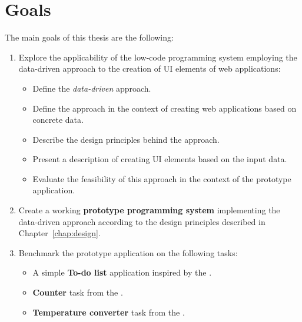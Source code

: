 \section*{Goals}
\nopagebreak[4]
The main goals of this thesis are the following:
\nopagebreak[4]
\begin{enumerate}
	\item Explore the applicability of the low-code programming system employing the data-driven approach to the creation of UI elements of web applications:
	      \begin{itemize}
		      \item Define the \emph{data-driven} approach.
		      \item Define the approach in the context of creating web applications based on concrete data.
		      \item Describe the design principles behind the approach.
		      \item Present a description of creating UI elements based on the input data.
		      \item Evaluate the feasibility of this approach in the context of the prototype application.
	      \end{itemize}
	\item Create a working \textbf{prototype programming system} implementing the data-driven approach according to the design principles described in Chapter~\ref{chap:design}.
	\item Benchmark the prototype application on the following tasks:
	      \begin{itemize}
		      \item A simple \textbf{To-do list} application inspired by the \citet{TodoMVC}.
		      \item \textbf{Counter} task from the \citet{7GUIs-web}.
		      \item \textbf{Temperature converter} task from the \citet{7GUIs-web}.
	      \end{itemize}
\end{enumerate}
\medskip
